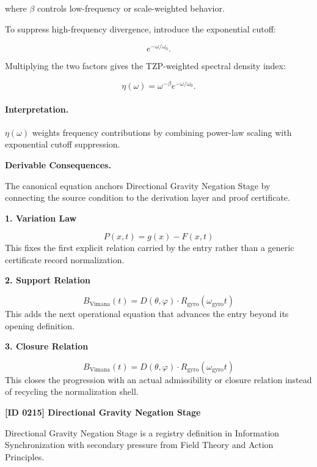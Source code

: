 where $\beta$ controls low-frequency or scale-weighted behavior.

To suppress high-frequency divergence, introduce the exponential cutoff:

\begin{equation}
e^{-\omega/\omega_0}.
\end{equation}

Multiplying the two factors gives the TZP-weighted spectral density index:

\begin{equation}
\boxed{
\eta(\omega)
=
\omega^{-\beta}
e^{-\omega/\omega_0}.
}
\end{equation}

\paragraph{Interpretation.}
$\eta(\omega)$ weights frequency contributions by combining power-law scaling with exponential cutoff suppression.

\par\vspace{0.35em}
\noindent\textbf{Derivable Consequences.}\quad
\begingroup
\footnotesize
\raggedright
The canonical equation anchors Directional Gravity Negation Stage by connecting the source condition to the derivation layer and proof certificate.
\par\endgroup

\noindent\textbf{1. Variation Law}\par
\[
P(x,t) = g(x) - F(x,t)
\]
\noindent This fixes the first explicit relation carried by the entry rather than a generic certificate record normalization.\par
\noindent\textbf{2. Support Relation}\par
\[
B_{\mathrm{Vimana}}(t) = D(\theta,\varphi) \cdot R_{\mathrm{gyro}}(\omega_{\mathrm{gyro}} t)
\]
\noindent This adds the next operational equation that advances the entry beyond its opening definition.\par
\noindent\textbf{3. Closure Relation}\par
\[
B_{\mathrm{Vimana}}(t) = D(\theta,\varphi) \cdot R_{\mathrm{gyro}}(\omega_{\mathrm{gyro}} t)
\]
\noindent This closes the progression with an actual admissibility or closure relation instead of recycling the normalization shell.\par

\clearpage
\noindent\textbf{[ID 0215] Directional Gravity Negation Stage}\par
\vspace{0.35em}
\begingroup\small
{}
Directional Gravity Negation Stage is a registry definition in Information Synchronization with secondary pressure from Field Theory and Action Principles.

